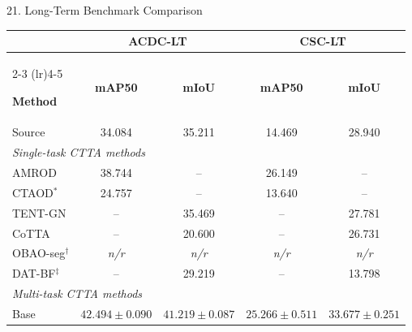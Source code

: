 \documentclass[aspectratio=169,11pt]{beamer}
\begin{document}
\begin{frame}{21. Long-Term Benchmark Comparison}

\scriptsize
\centering

\vspace{-0.12cm}

\setlength{\tabcolsep}{4.0pt}
\renewcommand{\arraystretch}{1.00}

\begin{tabular}{lcccc}
\toprule
&
\multicolumn{2}{c}{\textbf{ACDC-LT}}
&
\multicolumn{2}{c}{\textbf{CSC-LT}}
\\
\cmidrule(lr){2-3}
\cmidrule(lr){4-5}

\textbf{Method}
& \textbf{mAP50}
& \textbf{mIoU}
& \textbf{mAP50}
& \textbf{mIoU}
\\
\midrule

Source
& 34.084
& 35.211
& 14.469
& 28.940
\\

\midrule

\multicolumn{5}{l}{\textit{Single-task CTTA methods}} \\[-2pt]

AMROD
& 38.744
& --
& 26.149
& --
\\

CTAOD$^\ast$
& 24.757
& --
& 13.640
& --
\\

TENT-GN
& --
& 35.469
& --
& 27.781
\\

CoTTA
& --
& 20.600
& --
& 26.731
\\

OBAO-seg$^\dagger$
& \textit{n/r}
& \textit{n/r}
& \textit{n/r}
& \textit{n/r}
\\

DAT-BF$^\ddagger$
& --
& 29.219
& --
& 13.798
\\

\midrule

\multicolumn{5}{l}{\textit{Multi-task CTTA methods}} \\[-2pt]

Base
& $42.494\pm0.090$
& $41.219\pm0.087$
& $25.266\pm0.511$
& $\mathbf{33.677\pm0.251}$
\\


\end{tabular}
\end{frame}
\end{document}
